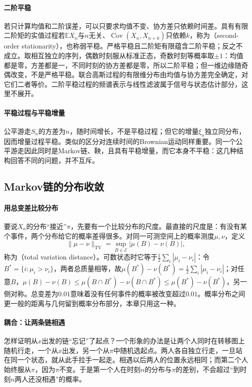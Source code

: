\paragraph{二阶平稳}
若只计算均值和二阶误差，可以只要求均值不变、协方差只依赖时间差。具有有限二阶矩的实值过程若$\mathbb EX_n$与$n$无关、$\operatorname{Cov}(X_n,X_{n+k})$只依赖$k$，称为（second-order stationarity），也称弱平稳。严格平稳且二阶矩有限蕴含二阶平稳；反之不成立。取相互独立的序列，偶数时刻服从标准正态，奇数时刻等概率取$\pm1$：均值都是零，方差都是一，不同时刻的协方差都是零，所以二阶平稳；但一维边缘随奇偶改变，不是严格平稳。联合高斯过程的有限维分布由均值与协方差完全确定，对它们二者等价。二阶平稳过程的频谱表示与线性滤波属于信号与状态估计部分，这里不展开。

\paragraph{平稳过程与平稳增量}
公平游走$S_n$的方差为$n$，随时间增长，不是平稳过程；但它的增量$\xi_n$独立同分布，因而增量过程平稳。类似的区分对连续时间的Brownian运动同样重要。同一个公平游走因此同时是Markov链、鞅，且具有平稳增量，而它本身不平稳：这几种结构回答不同的问题，并不互斥。

\subsection{Markov链的分布收敛}
\label{sec:dtsp-distribution-convergence}

\paragraph{用总变差比较分布}
要说$X_n$的分布“接近”$\pi$，先要有一个比较分布的尺度。最直接的尺度是：有没有某个事件，两个分布给它的概率差得很多。对同一可测空间上的概率测度$\mu,\nu$，定义
\[
  \lVert\mu-\nu\rVert_{\mathrm{TV}}=\sup_{B\in\mathcal E}|\mu(B)-\nu(B)|,
\]
称为（total variation distance）。可数状态时它等于$\frac12\sum_i|\mu_i-\nu_i|$：令$B^\ast=\{i:\mu_i>\nu_i\}$，两者总质量相等，故$\mu(B^\ast)-\nu(B^\ast)=\frac12\sum_i|\mu_i-\nu_i|$；对任意$B$，$\mu(B)-\nu(B)\leq\mu(B\cap B^\ast)-\nu(B\cap B^\ast)\leq\mu(B^\ast)-\nu(B^\ast)$，另一侧对称。总变差为$0.01$意味着没有任何事件的概率被改变超过$0.01$。概率分布之间更一般的距离与几何留到概率分布部分，本章只用这一种。

\paragraph{耦合：让两条链相遇}
怎样证明从$x$出发的链“忘记”了起点？一个形象的办法是让两个人同时在转移图上随机行走，一个从$x$出发，另一个从$\pi$中随机选起点。两人各自独立行走，一旦站在同一个状态，就从此手拉手一起走。相遇以后两人的位置永远相同；而第二个人始终服从$\pi$，因为$\pi$不变。于是第一个人在时刻$n$的分布与$\pi$的差别，不会超过“到时刻$n$两人还没相遇”的概率。

